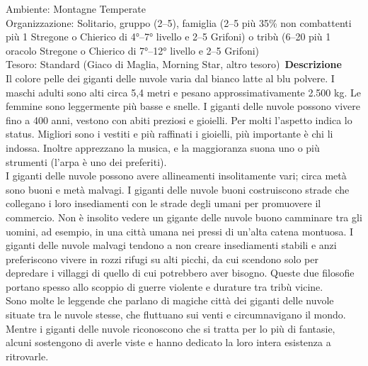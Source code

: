 \begin{multicols}{2}
Ambiente: Montagne Temperate\\
Organizzazione: Solitario, gruppo (2–5), famiglia (2–5 più 35\% non combattenti più 1 Stregone o Chierico di 4°–7° livello e 2–5 Grifoni) o tribù (6–20 più 1 oracolo Stregone o Chierico di 7°–12° livello e 2–5 Grifoni)\\
Tesoro: Standard (Giaco di Maglia, Morning Star, altro tesoro)\
\textbf{Descrizione}\\
Il colore pelle dei giganti delle nuvole varia dal bianco latte al blu polvere. I maschi adulti sono alti circa 5,4 metri e pesano approssimativamente 2.500 kg. Le femmine sono leggermente più basse e snelle. I giganti delle nuvole possono vivere fino a 400 anni, vestono con abiti preziosi e gioielli. Per molti l’aspetto indica lo status. Migliori sono i vestiti e più raffinati i gioielli, più importante è chi li indossa. Inoltre apprezzano la musica, e la maggioranza suona uno o più strumenti (l’arpa è uno dei preferiti).\\

I giganti delle nuvole possono avere allineamenti insolitamente vari; circa metà sono buoni e metà malvagi. I giganti delle nuvole buoni costruiscono strade che collegano i loro insediamenti con le strade degli umani per promuovere il commercio. Non è insolito vedere un gigante delle nuvole buono camminare tra gli uomini, ad esempio, in una città umana nei pressi di un’alta catena montuosa. I giganti delle nuvole malvagi tendono a non creare insediamenti stabili e anzi preferiscono vivere in rozzi rifugi su alti picchi, da cui scendono solo per depredare i villaggi di quello di cui potrebbero aver bisogno. Queste due filosofie portano spesso allo scoppio di guerre violente e durature tra tribù vicine.\\

Sono molte le leggende che parlano di magiche città dei giganti delle nuvole situate tra le nuvole stesse, che fluttuano sui venti e circumnavigano il mondo. Mentre i giganti delle nuvole riconoscono che si tratta per lo più di fantasie, alcuni sostengono di averle viste e hanno dedicato la loro intera esistenza a ritrovarle.\\


\end{multicols}
